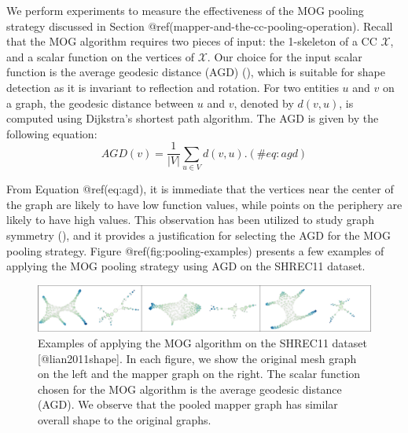 \documentclass[
  12pt,
]{krantz}
\begin{document}
We perform experiments to measure the effectiveness of the MOG pooling
strategy discussed in Section @ref(mapper-and-the-cc-pooling-operation).
Recall that the MOG algorithm requires two pieces of input: the
1-skeleton of a CC \(\mathcal{X}\), and a scalar function on the
vertices of \(\mathcal{X}\). Our choice for the input scalar function is
the average geodesic distance (AGD) (), which is suitable for shape detection as it is
invariant to reflection and rotation. For two entities \(u\) and \(v\)
on a graph, the geodesic distance between \(u\) and \(v\), denoted by
\(d(v,u)\), is computed using Dijkstra's shortest path algorithm. The
AGD is given by the following equation: \begin{equation}
AGD(v)=\frac{1}{|V|}\sum_{u\in V}d(v,u).
(\#eq:agd)
\end{equation}

From Equation @ref(eq:agd), it is immediate that the vertices near the
center of the graph are likely to have low function values, while points
on the periphery are likely to have high values. This observation has
been utilized to study graph symmetry
(), and it
provides a justification for selecting the AGD for the MOG pooling
strategy. Figure @ref(fig:pooling-examples) presents a few examples of
applying the MOG pooling strategy using AGD on the SHREC11 dataset.

\begin{figure}

{\centering \includegraphics{figures/pooling_examples} 

}

\caption{Examples of applying the MOG algorithm on the SHREC11 dataset [@lian2011shape]. In each figure, we show the original mesh graph on the left and the mapper graph on the right. The scalar function chosen for the MOG algorithm is the average geodesic distance (AGD). We observe that the pooled mapper graph has similar overall shape to the original graphs.}\label{fig:pooling-examples}
\end{figure}
\end{document}
